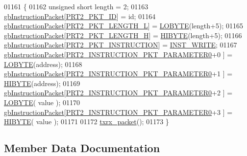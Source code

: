 \begin{DoxyCode}
01161 \{
01162     \textcolor{keywordtype}{unsigned} \textcolor{keywordtype}{short} length = 2;
01163     \hyperlink{classdynamixel2_a298efe9115fdbf77019af1001e801fb4}{gbInstructionPacket}[\hyperlink{dynamixel_8h_a3524b007f8f56ad0d80c1d0caf7e968a}{PRT2\_PKT\_ID}]                      = id;
01164     \hyperlink{classdynamixel2_a298efe9115fdbf77019af1001e801fb4}{gbInstructionPacket}[\hyperlink{dynamixel_8h_a9e77ab568957b64786c810967dec8b0c}{PRT2\_PKT\_LENGTH\_L}]                  = 
      \hyperlink{dynamixel_8h_a04c0416272e5c07bdf955d803a21688e}{LOBYTE}(length+5);
01165     \hyperlink{classdynamixel2_a298efe9115fdbf77019af1001e801fb4}{gbInstructionPacket}[\hyperlink{dynamixel_8h_a5ea18a21d722bf72217d5408c4d2a868}{PRT2\_PKT\_LENGTH\_H}]                  = 
      \hyperlink{dynamixel_8h_a75c5b5f21e837e80c0feb4da9a421f87}{HIBYTE}(length+5);
01166     \hyperlink{classdynamixel2_a298efe9115fdbf77019af1001e801fb4}{gbInstructionPacket}[\hyperlink{dynamixel_8h_aece9dd9d7c0fa1714d53c568865d79ad}{PRT2\_PKT\_INSTRUCTION}]                = 
      \hyperlink{dynamixel_8h_a1c304d06170982719fd605a87c9101f0}{INST\_WRITE};
01167     \hyperlink{classdynamixel2_a298efe9115fdbf77019af1001e801fb4}{gbInstructionPacket}[\hyperlink{dynamixel_8h_a349ccb89ae957bdcc16856ec8e2dcb00}{PRT2\_INSTRUCTION\_PKT\_PARAMETER0}+0
      ]    = \hyperlink{dynamixel_8h_a04c0416272e5c07bdf955d803a21688e}{LOBYTE}(address);
01168     \hyperlink{classdynamixel2_a298efe9115fdbf77019af1001e801fb4}{gbInstructionPacket}[\hyperlink{dynamixel_8h_a349ccb89ae957bdcc16856ec8e2dcb00}{PRT2\_INSTRUCTION\_PKT\_PARAMETER0}+1
      ]    = \hyperlink{dynamixel_8h_a75c5b5f21e837e80c0feb4da9a421f87}{HIBYTE}(address);
01169     \hyperlink{classdynamixel2_a298efe9115fdbf77019af1001e801fb4}{gbInstructionPacket}[\hyperlink{dynamixel_8h_a349ccb89ae957bdcc16856ec8e2dcb00}{PRT2\_INSTRUCTION\_PKT\_PARAMETER0}+2
      ]    = \hyperlink{dynamixel_8h_a04c0416272e5c07bdf955d803a21688e}{LOBYTE}( value );
01170     \hyperlink{classdynamixel2_a298efe9115fdbf77019af1001e801fb4}{gbInstructionPacket}[\hyperlink{dynamixel_8h_a349ccb89ae957bdcc16856ec8e2dcb00}{PRT2\_INSTRUCTION\_PKT\_PARAMETER0}+3
      ]    = \hyperlink{dynamixel_8h_a75c5b5f21e837e80c0feb4da9a421f87}{HIBYTE}( value );
01171     
01172     \hyperlink{classdynamixel2_a2cccd455a52afe99a37b249aa834cdc7}{txrx\_packet}();
01173 \}
\end{DoxyCode}


\subsection{Member Data Documentation}
\hypertarget{classdynamixel2_a69e9133771b69c828c277cb7191d3474}{}
